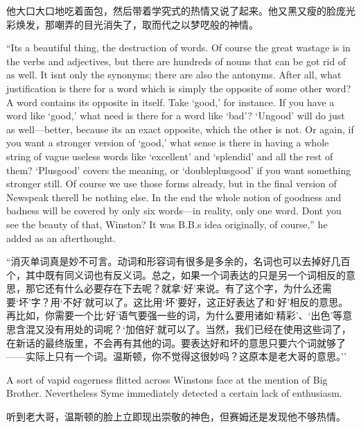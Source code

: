 \begin{paracol}{2}
\switchcolumn

他大口大口地吃着面包，然后带着学究式的热情又说了起来。他又黑又瘦的脸庞光彩焕发，那嘲弄的目光消失了，取而代之以梦呓般的神情。

\switchcolumn*

``It\textquotesingle s a beautiful thing, the destruction of words. Of
course the great wastage is in the verbs and adjectives, but there are
hundreds of nouns that can be got rid of as well. It isn\textquotesingle t
only the synonyms; there are also the antonyms. After all, what
justification is there for a word which is simply the opposite of some other
word? A word contains its opposite in itself. Take `good,' for instance. If
you have a word like `good,' what need is there for a word like `bad'?
`Ungood' will do just as well---better, because it\textquotesingle s an
exact opposite, which the other is not. Or again, if you want a stronger
version of `good,' what sense is there in having a whole string of vague
useless words like `excellent' and `splendid' and all the rest of them?
`Plusgood' covers the meaning, or `doubleplusgood' if you want something
stronger still. Of course we use those forms already, but in the final
version of Newspeak there\textquotesingle ll be nothing else. In the end the
whole notion of goodness and badness will be covered by only six words---in
reality, only one word. Don\textquotesingle t you see the beauty of that,
Winston? It was B.B.\textquotesingle s idea originally, of course,'' he
added as an afterthought.

\switchcolumn

``消灭单词真是妙不可言。动词和形容词有很多是多余的，名词也可以去掉好几百个，其中既有同义词也有反义词。总之，如果一个词表达的只是另一个词相反的意思，那它还有什么必要存在下去呢？就拿`好'来说。有了这个字，为什么还需要`坏'字？用`不好'就可以了。这比用`坏'要好，这正好表达了和`好'相反的意思。再比如，你需要一个比`好'语气要强一些的词，为什么要用诸如`精彩'、`出色'等意思含混又没有用处的词呢？`加倍好'就可以了。当然，我们已经在使用这些词了，在新话的最终版里，不会再有其他的词。要表达好和坏的意思只要六个词就够了——实际上只有一个词。温斯顿，你不觉得这很妙吗？这原本是老大哥的意思。''

\switchcolumn*

A sort of vapid eagerness flitted across Winston\textquotesingle s face
at the mention of Big Brother. Nevertheless Syme immediately detected a
certain lack of enthusiasm.

\switchcolumn

听到老大哥，温斯顿的脸上立即现出崇敬的神色，但赛姆还是发现他不够热情。


\end{paracol}
